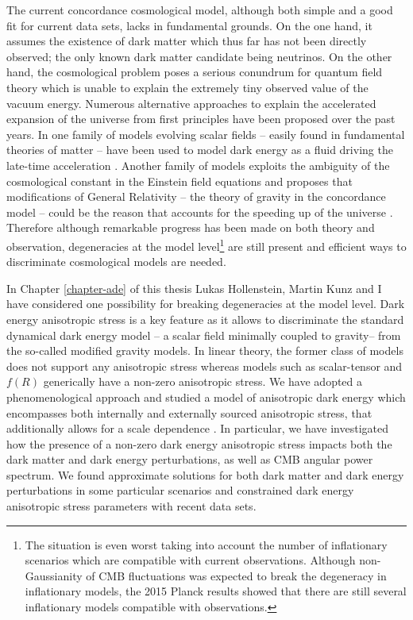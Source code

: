 The current concordance cosmological model, although both simple and a good fit for current data sets, lacks in fundamental grounds. On the one hand, it assumes the existence of dark matter which thus far has not been directly observed; the only known dark matter candidate being neutrinos. On the other hand, the cosmological problem poses a serious conundrum for quantum field theory which is unable to explain the extremely tiny observed value of the vacuum energy. Numerous alternative approaches to explain the accelerated expansion of the universe from first principles have been proposed over the past years. In one family of models evolving scalar fields -- easily found in fundamental theories of matter -- have been used to model dark energy as a fluid driving the late-time acceleration \cite{Copeland:2006wr}. Another family of models exploits the ambiguity of the cosmological constant in the Einstein field equations and proposes that modifications of General Relativity -- the theory of gravity in the concordance model -- could be the reason that accounts for the speeding up of the universe \cite{Clifton:2011jh}. Therefore although remarkable progress has been made on both theory and observation, degeneracies at the model level\footnote{The situation is even worst taking into account the number of inflationary scenarios which are compatible with current observations. Although non-Gaussianity of CMB fluctuations was expected to break the degeneracy in inflationary models, the 2015 Planck results \cite{Ade:2015ava,Ade:2015lrj} showed that there are still several inflationary models compatible with observations.} are still present and efficient ways to discriminate cosmological models are needed.   

In Chapter \ref{chapter-ade} of this thesis Lukas Hollenstein, Martin Kunz and I have considered one possibility for breaking degeneracies at the model level. Dark energy anisotropic stress is a key feature as it allows to discriminate the standard dynamical dark energy model -- a scalar field minimally coupled to gravity-- from the so-called modified gravity models. In linear theory, the former class of models does not support any anisotropic stress whereas models such as scalar-tensor and $f(R)$ generically have a non-zero anisotropic stress. We have adopted a phenomenological approach and studied a model of anisotropic dark energy which encompasses both internally and externally sourced anisotropic stress, that additionally allows for a scale dependence \cite{Cardona:2014iba}. In particular, we have investigated how the presence of a non-zero dark energy anisotropic stress impacts both the dark matter and dark energy perturbations, as well as CMB angular power spectrum. We found approximate solutions for both dark matter and dark energy perturbations in some particular scenarios and constrained dark energy anisotropic stress parameters with recent data sets. 

